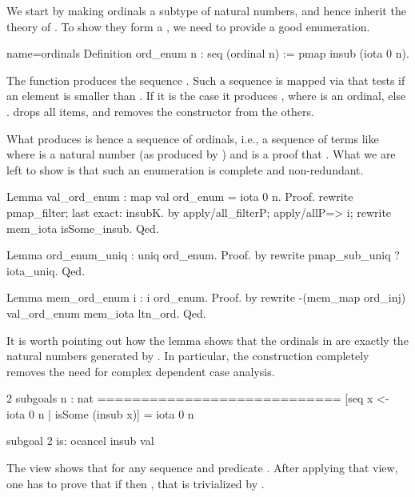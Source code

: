 We start by making ordinals a subtype of natural numbers, and hence
inherit the theory of .  To show they form a ,
we need to provide a good enumeration.

\begin{coq}{name=ordinals}{}
Definition ord_enum n : seq (ordinal n) := pmap insub (iota 0 n).
\end{coq}

The  function produces the sequence \C{[:: 0; 1; ...; n.-1]}.
Such a sequence is mapped via  that tests if an element 
is smaller than .  If it is the case it produces ,
where  is an ordinal, else .   drops all 
items, and removes the  constructor from the others.

What  produces is hence a sequence of ordinals, i.e.,
a sequence of terms like  where  is a natural
number (as produced by ) and  is a proof that .  What we are left to show is that such an enumeration is complete
and non-redundant.

\begin{coq}{}{}
Lemma val_ord_enum : map val ord_enum = iota 0 n.
Proof.
rewrite pmap_filter; last exact: insubK.
by apply/all_filterP; apply/allP=> i; rewrite mem_iota isSome_insub.
Qed.

Lemma ord_enum_uniq : uniq ord_enum.
Proof. by rewrite pmap_sub_uniq ?iota_uniq. Qed.

Lemma mem_ord_enum i : i \in ord_enum.
Proof. by rewrite -(mem_map ord_inj) val_ord_enum mem_iota ltn_ord. Qed.
\end{coq}

It is worth pointing out how the  lemma
shows that the ordinals in  are exactly the
natural numbers generated by .  In particular,
the  construction completely removes the need for
complex dependent case analysis.

\begin{coqout}{}{}
2 subgoals
n : nat
============================
[seq x <- iota 0 n | isSome (insub x)] = iota 0 n

subgoal 2 is:
  ocancel insub val
\end{coqout}

The view  shows that
 for any
sequence  and predicate .  After applying
that view, one has to prove that if  then , that is trivialized by .

